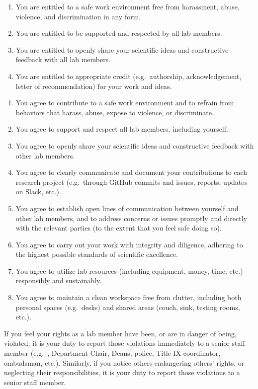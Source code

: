\documentclass{tufte-book} %
\begin{document}
\begin{enumerate}
\item You are entitled to a safe work environment free from
  harassment, abuse, violence, and discrimination in any form.
  \item You are entitled to be supported and respected by all lab
    members.
  \item You are entitled to openly share your scientific ideas and
    constructive feedback with all lab members.
  \item You are entitled to appropriate credit (e.g.\ authorship,
    acknowledgement, letter of recommendation) for your work and
    ideas.
\end{enumerate}

\begin{enumerate}
  \item You agree to contribute to a safe work environment and to refrain
    from behaviors that harass, abuse, expose to violence, or
    discriminate.
  \item You agree to support and respect all lab members, including
    yourself.
  \item You agree to openly share your scientific ideas and constructive
    feedback with other lab members.
  \item You agree to clearly communicate and document your
    contributions to each research project (e.g.\ through GitHub
    commits and issues, reports, updates on Slack, etc.).
  \item You agree to establish open lines of communication between
    yourself and other lab members, and to address concerns or issues
    promptly and directly with the relevant parties (to the extent
    that you feel safe doing so).
  \item You agree to carry out your work with integrity and diligence,
    adhering to the highest possible standards of scientific
    excellence.
  \item You agree to utilize lab resources (including equipment,
    money, time, etc.) responsibly and sustainably.
  \item You agree to maintain a clean workspace free from clutter,
    including both personal spaces (e.g.\  desks) and shared
    areas (couch, sink, testing rooms, etc.).
\end{enumerate}


\noindent If you feel your rights as a lab member have been, or are in
danger of being, violated, it is your duty to report those violations
immediately to a senior staff member (e.g.\ \director, Department
Chair, Deans, police, Title IX coordinator, ombudsman, etc.).
Similarly, if you notice others endangering others' rights, or
neglecting their responsibilities, it is your duty to report those
violations to a senior staff member.
\end{document}
